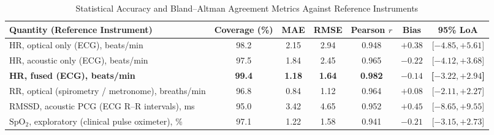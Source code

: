 \documentclass[journal]{IEEEtran}
\newcommand{\spo}{\mathrm{SpO_2}}
\begin{document}
\begin{table}[!t]
\centering
\caption{Statistical Accuracy and Bland--Altman Agreement Metrics Against Reference Instruments}
\label{tab:agreement}
\footnotesize
\renewcommand{\arraystretch}{1.1}
\begin{tabular}{@{}l c c c c c c@{}}
\toprule
\textbf{Quantity (Reference Instrument)} & \textbf{Coverage (\%)} & \textbf{MAE} & \textbf{RMSE} & \textbf{Pearson $r$} & \textbf{Bias} & \textbf{95\% LoA} \\
\midrule
HR, optical only (ECG), beats/min & 98.2 & 2.15 & 2.94 & 0.948 & $+0.38$ & [$-4.85, +5.61$] \\
HR, acoustic only (ECG), beats/min & 97.5 & 1.84 & 2.45 & 0.965 & $-0.22$ & [$-4.12, +3.68$] \\
\textbf{HR, fused (ECG), beats/min} & \textbf{99.4} & \textbf{1.18} & \textbf{1.64} & \textbf{0.982} & $\mathbf{-0.14}$ & \textbf{[$-3.22, +2.94$]} \\
RR, optical (spirometry / metronome), breaths/min & 96.8 & 0.84 & 1.12 & 0.964 & $+0.08$ & [$-2.11, +2.27$] \\
RMSSD, acoustic PCG (ECG R--R intervals), ms & 95.0 & 3.42 & 4.65 & 0.952 & $+0.45$ & [$-8.65, +9.55$] \\
$\spo$, exploratory (clinical pulse oximeter), \% & 97.1 & 1.22 & 1.58 & 0.941 & $-0.21$ & [$-3.15, +2.73$] \\
\bottomrule
\end{tabular}
\end{table}

\begin{table}[!t]
\centering
\caption{HR MAE (beats/min) by Condition and Pipeline Configuration}
\label{tab:condition}
\footnotesize
\renewcommand{\arraystretch}{1.1}
\setlength{\tabcolsep}{4pt}
\end{table}
\end{document}
